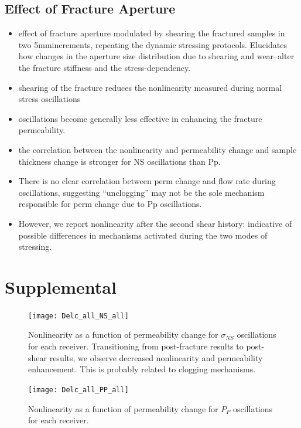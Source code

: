 \documentclass[letterpaper,10pt]{article}
\begin{document}
\newpage

\subsection{Effect of Fracture Aperture}
\begin{itemize}
	\item effect of fracture aperture modulated by shearing the fractured samples in two 5mmincrements, repeating the dynamic stressing protocols. Elucidates how changes in the aperture size distribution due to shearing and wear–alter the fracture stiffness and the stress-dependency.
	\item shearing of the fracture reduces the nonlinearity measured during normal stress oscillations
	\item oscillations become generally less effective in enhancing the fracture permeability.
	\item the correlation between the nonlinearity and permeability change and sample thickness change is stronger for NS oscillations than Pp. 
	\item There is no clear correlation between perm change and flow rate during oscillations, suggesting “unclogging” may not be the sole mechanism responsible for perm change due to Pp oscillations. 
	\item However, we report nonlinearity after the second shear history: indicative of possible differences in mechanisms activated during the two modes of stressing.
\end{itemize}


\section{Supplemental}
\begin{figure}[ht]
	\centering
	\texttt{[image: Delc\_all\_NS\_all]}
	\caption{Nonlinearity as a function of permeability change for $ \sigma_{NS} $ oscillations for each receiver. Transitioning from post-fracture results to post-shear results, we observe decreased nonlinearity and permeability enhancement. This is probably related to clogging mechanisms.}%
	\label{fig:delc_plots}
\end{figure}

\newpage

\begin{figure}[ht]
	\centering
	\texttt{[image: Delc\_all\_PP\_all]}
	\caption{Nonlinearity as a function of permeability change for $ P_P $ oscillations for each receiver.}
	\label{fig:delc_plots2}
\end{figure}

\newpage

\end{document}
